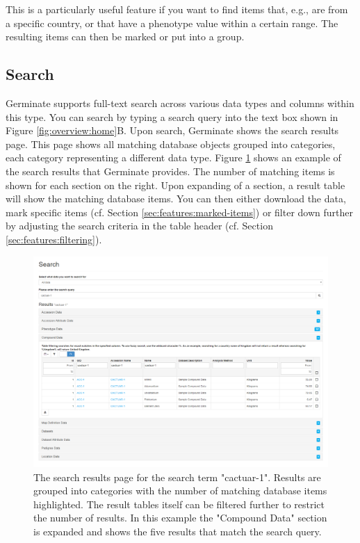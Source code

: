 This is a particularly useful feature if you want to find items that, e.g., are from a specific country, or that have a phenotype value within a certain range. The resulting items can then be marked or put into a group.

\subsection{Search}
\label{sec:features:search}
Germinate supports full-text search across various data types and columns within this type. You can search by typing a search query into the text box shown in Figure \ref{fig:overview:home}B. Upon search, Germinate shows the search results page. This page shows all matching database objects grouped into categories, each category representing a different data type. Figure \ref{fig:features:search} shows an example of the search results that Germinate provides. The number of matching items is shown for each section on the right. Upon expanding of a section, a result table will show the matching database items. You can then either download the data, mark specific items (cf. Section \ref{sec:features:marked-items}) or filter down further by adjusting the search criteria in the table header (cf. Section \ref{sec:features:filtering}).

\begin{figure}
	\centering
	\includegraphics[width=0.85\linewidth]{img/features/search.png}
	\caption{The search results page for the search term "cactuar-1". Results are grouped into categories with the number of matching database items highlighted. The result tables itself can be filtered further to restrict the number of results. In this example the "Compound Data" section is expanded and shows the five results that match the search query.}
	\label{fig:features:search}
\end{figure}

